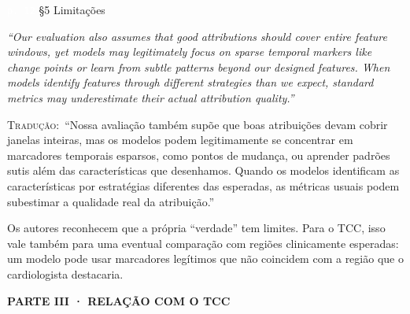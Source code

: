 \documentclass[11pt,a4paper]{article}
\newcommand{\pagechip}[1]{{\setlength{\fboxsep}{1.5pt}\colorbox{cAcc}{\textcolor{white}{\scriptsize\texttt{#1}}}}}
\newcommand{\partbar}[1]{\par\vspace{1.2em}\noindent\colorbox{black!80}{\parbox{\dimexpr\linewidth-2\fboxsep}{\color{white}\bfseries\sffamily\MakeUppercase{#1}}}\par\vspace{0.4em}}
\newenvironment{origquote}{\par\itshape\small}{\par}
\newenvironment{tradquote}{\par\small\textsc{Tradução:}\ }{\par}
\newcommand{\explab}[1]{\par\smallskip{\small\color{cAcc}\textbf{\MakeUppercase{#1}}}\par}
\begin{document}
\begin{citacard}{\pagechip{p. 12} §5 Limitações}
\begin{origquote}“Our evaluation also assumes that good attributions should cover entire feature windows, yet models may legitimately focus on sparse temporal markers like change points or learn from subtle patterns beyond our designed features. When models identify features through different strategies than we expect, standard metrics may underestimate their actual attribution quality.”\end{origquote}
\begin{tradquote}“Nossa avaliação também supõe que boas atribuições devam cobrir janelas inteiras, mas os modelos podem legitimamente se concentrar em marcadores temporais esparsos, como pontos de mudança, ou aprender padrões sutis além das características que desenhamos. Quando os modelos identificam as características por estratégias diferentes das esperadas, as métricas usuais podem subestimar a qualidade real da atribuição.”\end{tradquote}
\explab{Explicação}
Os autores reconhecem que a própria “verdade” tem limites. Para o TCC, isso vale também para uma eventual comparação com regiões clinicamente esperadas: um modelo pode usar marcadores legítimos que não coincidem com a região que o cardiologista destacaria.
\end{citacard}

\partbar{Parte III · Relação com o TCC}
\end{document}
